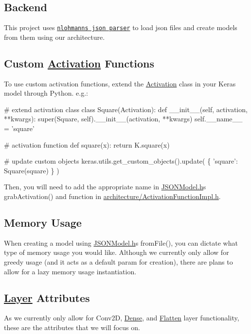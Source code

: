 \subsection*{Backend}

This project uses \href{https://github.com/nlohmann/json}{\tt nlohmann\textquotesingle{}s json parser} to load json files and create models from them using our architecture.

\subsection*{Custom \hyperlink{classActivation}{Activation} Functions}

To use custom activation functions, extend the \hyperlink{classActivation}{Activation} class in your Keras model through Python. e.\+g.\+: 
\begin{DoxyCode}
# extend activation class
class Square(Activation):
    def \_\_init\_\_(self, activation, **kwargs):
        super(Square, self).\_\_init\_\_(activation, **kwargs)
        self.\_\_name\_\_ = 'square'

# activation function
def square(x):
    return K.square(x)

# update custom objects
keras.utils.get\_custom\_objects().update( \{ 'square': Square(square) \} )
\end{DoxyCode}
 Then, you will need to add the appropriate name in \hyperlink{JSONModel_8h_source}{J\+S\+O\+N\+Model.\+h}\textquotesingle{}s {\ttfamily grab\+Activation()} and function in {\ttfamily \hyperlink{ActivationFunctionImpl_8h_source}{architecture/\+Activation\+Function\+Impl.\+h}}.

\subsection*{Memory Usage}

When creating a model using \hyperlink{JSONModel_8h_source}{J\+S\+O\+N\+Model.\+h}\textquotesingle{}s {\ttfamily from\+File()}, you can dictate what type of memory usage you would like. Although we currently only allow for greedy usage (and it acts as a default param for creation), there are plans to allow for a lazy memory usage instantiation.

\subsection*{\hyperlink{classLayer}{Layer} Attributes}

As we currently only allow for Conv2D, \hyperlink{classDense}{Dense}, and \hyperlink{classFlatten}{Flatten} layer functionality, these are the attributes that we will focus on.


